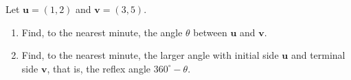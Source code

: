 Let $\mathbf{u}=(1,2)$ and $\mathbf{v}=(3,5)$.
\begin{enumerate}
\item[(a)] Find, to the nearest minute, the angle $\theta$ between $\mathbf{u}$ and $\mathbf{v}$.
\item[(b)] Find, to the nearest minute, the larger angle with initial side $\mathbf{u}$ and terminal side $\mathbf{v}$, that is, the reflex angle $360^\circ-\theta$.
\end{enumerate}
